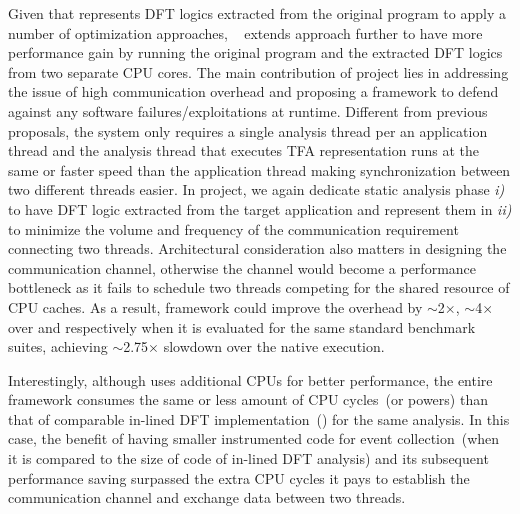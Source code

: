 \documentclass[letterpaper, 10pt]{article}
\begin{document}
\begin{small}
%
Given that \TFA represents DFT logics extracted from the original program to
apply a number of optimization approaches, \SR~\cite{sreplica:2013ccs} extends
\TFA approach further to have more performance gain by running the original
program and the extracted DFT logics from two separate CPU cores.
%
%
The main contribution of \SR project lies in addressing the issue of high
communication overhead and proposing a framework  to defend against any
software failures/exploitations at runtime. Different from previous proposals,
the system only requires a single analysis thread per an application thread and
the analysis thread that executes TFA representation runs at the same or faster
speed than the application thread making synchronization between two different
threads easier.
%
In \SR project, we again dedicate static analysis phase {\it i)} to have DFT
logic extracted from the target application and represent them in \TFA\xspace
{\it ii)}  to minimize the volume and frequency of the communication
requirement connecting two threads.
%
Architectural consideration also matters in designing the communication
channel, otherwise the channel would become a performance bottleneck as it
fails to schedule two threads competing for the shared resource of CPU caches.
%
As a result, \SR framework could improve the overhead by $\sim$2$\times$,
$\sim$4$\times$ over \TFA and \libdft respectively when it is evaluated for the
same standard benchmark suites, achieving $\sim$2.75$\times$ slowdown over the
native execution.

Interestingly, although \SR uses additional CPUs for better performance, the
entire framework consumes the same or less amount of CPU cycles~(or powers)
than that of comparable in-lined DFT implementation~(\TFA) for the same
analysis.
%
In this case, the benefit of having smaller instrumented code for event
collection~(when it is compared to the size of code of in-lined DFT analysis)
and its subsequent performance saving surpassed the extra CPU cycles it pays to
establish the communication channel and exchange data between two threads.


\end{small}
\end{document}
